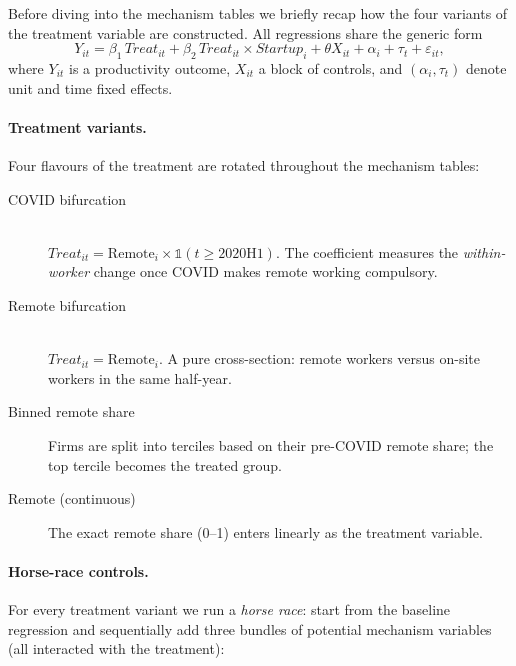 \documentclass{article}
\begin{document}
\clearpage
\begin{landscape}

\iffalse
Before diving into the mechanism tables we briefly recap how the four
variants of the treatment variable are constructed.  All regressions share
the generic form
\begin{equation*}
  Y_{it} = \beta_1\,\textit{Treat}_{it} + \beta_2\,\textit{Treat}_{it}\times\textit{Startup}_i + \theta X_{it} + \alpha_i + \tau_t + \varepsilon_{it},
\end{equation*}
where $Y_{it}$ is a productivity outcome, $X_{it}$ a block of controls, and
$(\alpha_i,\tau_t)$ denote unit and time fixed effects.

\paragraph{Treatment variants.}  Four flavours of the treatment are rotated
throughout the mechanism tables:
\begin{description}
  \item[COVID bifurcation]~\\
    \( \textit{Treat}_{it}=\text{Remote}_i\times\mathds{1}(t\ge 2020\text{H}1) \).  The
    coefficient measures the \emph{within‐worker} change once COVID makes
    remote working compulsory.

  \item[Remote bifurcation]~\\
    \( \textit{Treat}_{it}=\text{Remote}_i \).  A pure cross-section: remote
    workers versus on-site workers in the same half-year.

  \item[Binned remote share]  Firms are split into terciles based on their
    pre-COVID remote share; the top tercile becomes the treated group.

  \item[Remote (continuous)]  The exact remote share (0–1) enters linearly as
    the treatment variable.
\end{description}

\paragraph{Horse-race controls.}  For every treatment variant we run a
\emph{horse race}: start from the baseline regression and sequentially add
three bundles of potential mechanism variables (all interacted with the
treatment):


\end{landscape}
\end{document}
